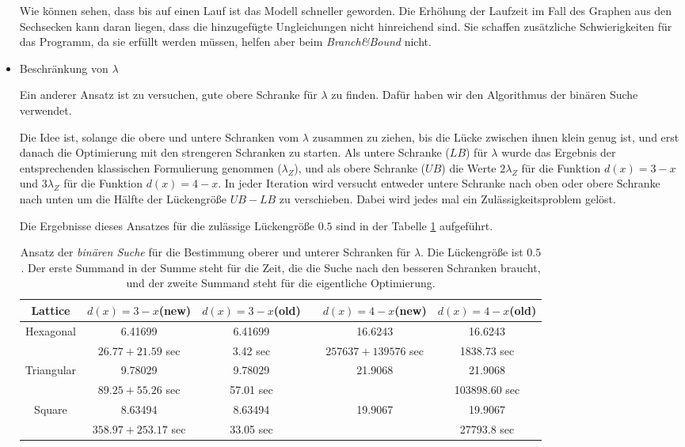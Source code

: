 \documentclass[
	fontsize=12pt,
	paper=a4,
	twoside=false,
	numbers=noenddot,
	plainheadsepline,
	toc=listof,
	toc=bibliography
]{scrartcl}
\begin{document}
\begin{itemize}
	Wie können sehen, dass bis auf einen Lauf ist das Modell schneller geworden. Die Erhöhung der Laufzeit im Fall des Graphen aus den Sechsecken kann daran liegen, dass die hinzugefügte Ungleichungen nicht hinreichend sind. Sie schaffen zusätzliche Schwierigkeiten für das Programm, da sie erfüllt werden müssen, helfen aber beim {\it Branch\&Bound} nicht. 

	\item Beschränkung von $\lambda$ 
	
	Ein anderer Ansatz ist zu versuchen, gute obere Schranke für $\lambda$ zu finden. Dafür haben wir den Algorithmus der binären Suche verwendet.
	
	Die Idee ist, solange die obere und untere Schranken vom $\lambda$ zusammen zu ziehen, bis die Lücke zwischen ihnen klein genug ist, und erst danach die Optimierung mit den strengeren Schranken zu starten.
	Als untere %
	Schranke ($LB$) für $\lambda$ wurde das Ergebnis der entsprechenden klassischen Formulierung genommen ($\lambda_Z$), und als obere Schranke ($UB$) die Werte $2\lambda_Z$ für die Funktion $d(x)=3-x$ und $3\lambda_Z$ für die Funktion $d(x)=4-x$. In jeder Iteration wird versucht entweder untere Schranke nach oben oder obere Schranke nach unten um die Hälfte der Lückengröße $UB-LB$ zu verschieben. Dabei wird jedes mal ein Zulässigkeitsproblem gelöst. 
	
	Die Ergebnisse dieses Ansatzes für die zulässige Lückengröße $0.5$ sind in der Tabelle \ref{Table:BB} aufgeführt.
	
	\begin{table}[htbp]
	\centering
	\begin{tabular}{|c|c|c|c|c|c|}
	\hline Lattice& $d(x)=3-x$(new)  & $d(x)=3-x$(old) && $d(x)=4-x$(new)  & $d(x)=4-x$(old)\\ \hline 
		Hexagonal	&  6.41699	& 6.41699 && 16.6243 & 16.6243 \\ 
			& $26.77+21.59$ sec	& 3.42 sec && $257637+139576$ sec & 1838.73 sec \\ \hline
		Triangular	& 9.78029	&  9.78029 && 21.9068 & 21.9068 \\
			& $89.25+55.26$ sec	& 57.01 sec && & 103898.60 sec \\ \hline
		Square	& 8.63494	&   8.63494 &&  19.9067 & 19.9067\\
			& $358.97+253.17$ sec & 33.05 sec &&  & 27793.8 sec \\
	\hline
	\end{tabular}
	\caption{ Ansatz der {\it binären Suche} für die Bestimmung oberer und unterer Schranken für $\lambda$. Die Lückengröße ist $0.5$. Der erste Summand in der Summe steht für die Zeit, die die Suche nach den besseren Schranken braucht, und der zweite Summand steht für die eigentliche Optimierung.} 
	\label{Table:BB}
	\end{table}
	

\end{itemize}
\end{document}
